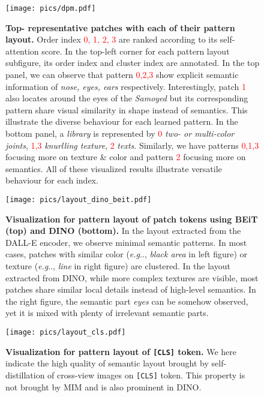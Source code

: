 \documentclass{article} \usepackage{iclr2022_conference,times}
\makeatletter
\DeclareRobustCommand\onedot{\futurelet\@let@token\@onedot}
\def\@onedot{\ifx\@let@token.\else.\null\fi\xspace}
\def\eg{\emph{e.g}\onedot} \def\Eg{\emph{E.g}\onedot}
\makeatother
\begin{document}
\begin{figure}[!t]
\centering
\texttt{[image: pics/dpm.pdf]}
\vspace{-0.2cm}
\caption{\textbf{Top- representative patches with each of their pattern layout.} Order index \textcolor{red}{0, 1, 2, 3} are ranked according to its self-attention score. In the top-left corner for each pattern layout subfigure, its order index and cluster index are annotated. In the top panel, we can observe that pattern \textcolor{red}{0,2,3} show explicit semantic information of \textit{nose, eyes, ears} respectively. Interestingly, patch \textcolor{red}{1} also locates around the eyes of the \textit{Samoyed} but its corresponding pattern share visual similarity in shape instead of semantics. This illustrate the diverse behaviour for each learned pattern. In the bottom panel, a \textit{library} is represented by \textcolor{red}{0} \textit{two- or multi-color joints}, \textcolor{red}{1,3} \textit{knurlling texture}, \textcolor{red}{2} \textit{texts}. Similarly, we have patterns \textcolor{red}{0,1,3} focusing more on texture \& color and pattern \textcolor{red}{2} focusing more on semantics. All of these visualized results illustrate versatile behaviour for each index.}
\vspace{-0.2cm}
\label{fig:dpm}
\end{figure}

\begin{figure}[!t]
\centering
\texttt{[image: pics/layout\_dino\_beit.pdf]}
\vspace{-0.6cm}
\caption{\textbf{Visualization for pattern layout of patch tokens using BEiT  (top) and DINO (bottom).} 
In the layout extracted from the DALL-E encoder, we observe minimal semantic patterns. In most cases, patches with similar color (\eg, \textit{black area} in left figure) or texture (\eg, \textit{line} in right figure) are clustered. 
In the layout extracted from DINO, while more complex textures are visible, most patches share similar local details instead of high-level semantics. In the right figure, the semantic part \textit{eyes} can be somehow observed, yet it is mixed with plenty of irrelevant semantic parts.}
\vspace{-0.4cm}
\label{fig:layout_dino_beit}
\end{figure}

\begin{figure}[!t]
\centering
\texttt{[image: pics/layout\_cls.pdf]}
\vspace{-0.6cm}
\caption{\textbf{Visualization for pattern layout of \texttt{[CLS]} token.} We here indicate the high quality of semantic layout brought by self-distillation of cross-view images on \texttt{[CLS]} token. This property is not brought by MIM and is also prominent in DINO.}
\vspace{-0.2cm}
\label{fig:layout_cls}
\end{figure}
\end{document}
